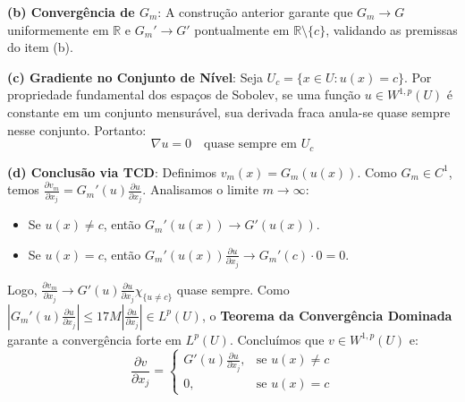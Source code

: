 \documentclass[cs_edp_2026.1.tex]{subfiles} %
\begin{document}
{	\textbf{(b) Convergência de $G_m$}:
	A construção anterior garante que $G_m \to G$ uniformemente em $\mathbb{R}$ e $G_m' \to G'$ pontualmente em $\mathbb{R} \setminus \{c\}$, validando as premissas do item (b).
	
	\textbf{(c) Gradiente no Conjunto de Nível}:
	Seja $U_c = \{x \in U : u(x) = c\}$. Por propriedade fundamental dos espaços de Sobolev, se uma função $u \in W^{1,p}(U)$ é constante em um conjunto mensurável, sua derivada fraca anula-se quase sempre nesse conjunto. Portanto:
	$$ \nabla u = 0 \quad \text{quase sempre em } U_c $$
	
	\textbf{(d) Conclusão via TCD}:
	Definimos $v_m(x) = G_m(u(x))$. Como $G_m \in C^1$, temos $\frac{\partial v_m}{\partial x_j} = G_m'(u) \frac{\partial u}{\partial x_j}$. Analisamos o limite $m \to \infty$:
	\begin{itemize}
		\item Se $u(x) \neq c$, então $G_m'(u(x)) \to G'(u(x))$.
		\item Se $u(x) = c$, então $G_m'(u(x)) \frac{\partial u}{\partial x_j} \to G_m'(c) \cdot 0 = 0$.
	\end{itemize}
	Logo, $\frac{\partial v_m}{\partial x_j} \to G'(u) \frac{\partial u}{\partial x_j} \chi_{\{u \neq c\}}$ quase sempre. Como $|G_m'(u) \frac{\partial u}{\partial x_j}| \le 17M |\frac{\partial u}{\partial x_j}| \in L^p(U)$, o \textbf{Teorema da Convergência Dominada} garante a convergência forte em $L^p(U)$. Concluímos que $v \in W^{1,p}(U)$ e:
	$$\boxed{\frac{\partial v}{\partial x_j} = \begin{cases} G'(u) \frac{\partial u}{\partial x_j}, & \text{se } u(x) \neq c \\ 0, & \text{se } u(x) = c \end{cases}}$$
}


\end{document}
